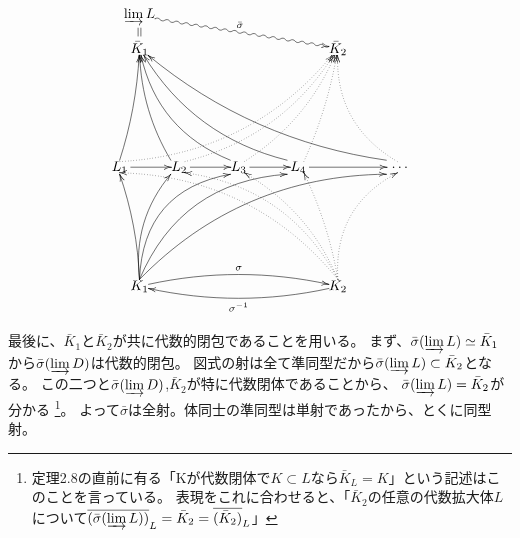 \documentclass[a4j]{jarticle}
\begin{document}
    \[
    \begin{xy}
        (00, 30)    *{L_1}="L1",
        (15, 30)    *{L_2}="L2",
        (30, 30)    *{L_3}="L3",
        (45, 30)    *{L_4}="L4",
        (70, 30)    *{~\dots}="Li",
        (5, 60)     *{\bar{K}_1}="cK1",
        (5, 00)     *{K_1}="K1",
        (55, 60)    *{\bar{K}_2}="cK2",
        (55, 00)    *{K_2}="K2",
        (5, 68)     *{\varinjlim L}="lim",

        \ar@{->}            "L1"+<0.8em,0em>;"L2"
        \ar@{->}            "L2"+<0.8em,0em>;"L3"
        \ar@{->}            "L3"+<0.8em,0em>;"L4"
        \ar@{->}            "L4"+<0.8em,0em>;"Li"

        \ar@{->}@/_1mm/ "K1"+<0.0em,0.5em>;"L1"+<-0.0em,-0.5em>
        \ar@{->}@/^3mm/ "K1"+<0.0em,0.5em>;"L2"+<-0.6em,-0.5em>
        \ar@{->}@/^7mm/ "K1"+<0.0em,0.5em>;"L3"+<-0.6em,-0.5em>
        \ar@{->}@/^7mm/ "K1"+<0.0em,0.5em>;"L4"+<-0.8em,-0.5em>
        \ar@{->}@/^7mm/ "K1"+<0.0em,0.5em>;"Li"+<-0.8em,-0.5em>
        \ar@{->}@/_1mm/ "L1"+<-0.0em,0.5em>;"cK1"
        \ar@{->}@/^2mm/ "L2"+<-0.6em,0.5em>;"cK1"
        \ar@{->}@/^5mm/ "L3"+<-0.6em,0.5em>;"cK1"
        \ar@{->}@/^5mm/ "L4"+<-0.8em,0.5em>;"cK1"
        \ar@{->}@/^5mm/ "Li"+<-0.8em,0.5em>;"cK1"

        \ar@{.>}@/_7mm/ "K2"+<0.0em,0.5em>;"L1"+<0.0em,-0.4em>
        \ar@{.>}@/_6mm/ "K2"+<0.0em,0.5em>;"L2"+<0.4em,-0.4em>
        \ar@{.>}@/_3mm/ "K2"+<0.0em,0.5em>;"L3"+<0.4em,-0.4em>
        \ar@{.>}@/_1mm/ "K2"+<0.0em,0.5em>;"L4"+<0.4em,-0.4em>
        \ar@{.>}@/^5mm/ "K2"+<0.0em,0.5em>;"Li"+<0.0em,-0.4em>
        \ar@{.>}@/_7mm/ "L1"+<0.0em,0.4em>;"cK2"
        \ar@{.>}@/_5mm/ "L2"+<0.4em,0.4em>;"cK2"
        \ar@{.>}@/_3mm/ "L3"+<0.4em,0.4em>;"cK2"
        \ar@{.>}@/_1mm/ "L4"+<0.4em,0.4em>;"cK2"
        \ar@{.>}@/^5mm/ "Li"+<0.0em,0.4em>;"cK2"

        \ar@{->}@/^3mm/^{\sigma} "K1";"K2"
        \ar@{->}@/^3mm/^{\sigma^{-1}} "K2";"K1"

        \ar@{=} "cK1"+<0mm,3mm>;"lim"+<0mm,-3mm>
        \ar@{~>}^{\bar{\sigma}} "lim";"cK2"
    \end{xy}
    \]

    最後に、$\bar{K}_1$と$\bar{K}_2$が共に代数的閉包であることを用いる。
    まず、$\bar{\sigma}(\varinjlim L) \simeq \bar{K}_1$から$\bar{\sigma}(\varinjlim D)$は代数的閉包。
    図式の射は全て準同型だから$\bar{\sigma}(\varinjlim L) \subset \bar{K}_2$となる。
    この二つと$\bar{\sigma}(\varinjlim D)$,$\bar{K}_2$が特に代数閉体であることから、
    $\bar{\sigma}(\varinjlim L)=\bar{K}_2$が分かる
    \footnote{定理2.8の直前に有る「Kが代数閉体で$K \subset L$なら$\bar{K}_L=K$」という記述はこのことを言っている。
    表現をこれに合わせると、「$\bar{K}_2$の任意の代数拡大体$L$について$\overline{(\bar{\sigma}(\varinjlim L))}_L=\bar{K}_2=\overline{(\bar{K}_2)}_L$」}。
    よって$\bar{\sigma}$は全射。体同士の準同型は単射であったから、とくに同型射。
\end{document}
